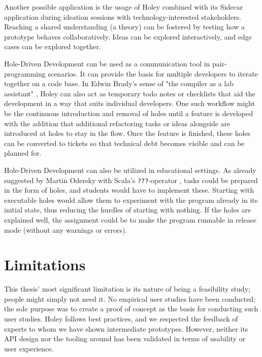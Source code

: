 Another possible application is the usage of Holey combined with its Sidecar application during ideation sessions with technology-interested stakeholders.
Reaching a shared understanding (a theory) can be fostered by testing how a prototype behaves collaboratively.
Ideas can be explored interactively, and edge cases can be explored together.

Hole-Driven Development can be used as a communication tool in pair-programming scenarios.
It can provide the basis for multiple developers to iterate together on a code base.
In Edwin Brady's sense of "the compiler as a lab assistant" \cite{brady_type-driven_2017}, Holey can also act as temporary todo notes or checklists that aid the development in a way that suits individual developers.
One such workflow might be the continuous introduction and removal of holes until a feature is developed with the addition that additional refactoring tasks or ideas alongside are introduced at holes to stay in the flow.
Once the feature is finished, these holes can be converted to tickets so that technical debt becomes visible and can be planned for.

Hole-Driven Development can also be utilized in educational settings.
As already suggested by Martin Odersky with Scala's \verb|???|-operator \cite{odersky_adding_2011}, tasks could be prepared in the form of holes, and students would have to implement these.
Starting with executable holes would allow them to experiment with the program already in its initial state, thus reducing the hurdles of starting with nothing.
If the holes are explained well, the assignment could be to make the program runnable in release mode (without any warnings or errors).



\section{Limitations}
\label{sec:discussion-limitations}
This thesis' most significant limitation is its nature of being a feasibility study; people might simply not need it.
No empirical user studies have been conducted; the sole purpose was to create a proof of concept as the basis for conducting such user studies.
Holey follows best practices, and we respected the feedback of experts to whom we have shown intermediate prototypes.
However, neither its API design nor the tooling around has been validated in terms of usability or user experience.

